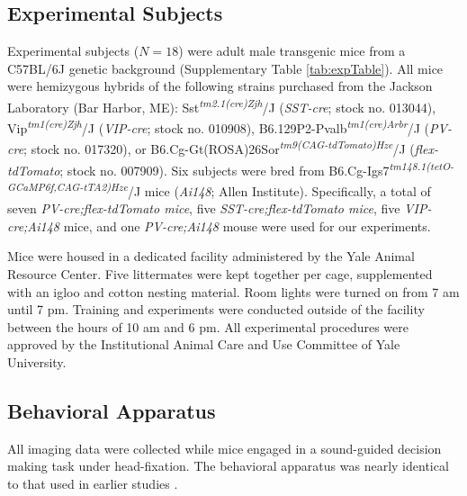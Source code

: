 

\label{sec:methods} %

\newcommand{\tg}[1]{\textsuperscript{\textit{#1}}}

\subsection*{Experimental Subjects}
Experimental subjects ($N=18$) were adult male transgenic mice from a C57BL/6J genetic background (Supplementary Table \ref{tab:expTable}). All mice were hemizygous hybrids of the following strains purchased from the Jackson Laboratory (Bar Harbor, ME): Sst\tg{tm2.1(cre)Zjh}/J (\emph{SST-cre}; stock no. 013044), Vip\tg{tm1(cre)Zjh}/J (\emph{VIP-cre}; stock no. 010908), B6.129P2-Pvalb\tg{tm1(cre)Arbr}/J (\emph{PV-cre}; stock no. 017320), or B6.Cg-Gt(ROSA)26Sor\tg{tm9(CAG-tdTomato)Hze}/J (\emph{flex-tdTomato}; stock no. 007909). Six subjects were bred from B6.Cg-Igs7\tg{tm148.1(tetO-GCaMP6f,CAG-tTA2)Hze}/J mice (\emph{Ai148}; Allen Institute). Specifically, a total of seven \emph{PV-cre;flex-tdTomato mice}, five \emph{SST-cre;flex-tdTomato mice}, five \emph{VIP-cre;Ai148} mice, and one \emph{PV-cre;Ai148} mouse were used for our experiments.



Mice were housed in a dedicated facility administered by the Yale Animal Resource Center. Five littermates were kept together per cage, supplemented with an igloo and cotton nesting material. Room lights were turned on from 7 am until 7 pm. Training and experiments were conducted outside of the facility between the hours of 10 am and 6 pm. All experimental procedures were approved by the Institutional Animal Care and Use Committee of Yale University.


\subsection*{Behavioral Apparatus}

All imaging data were collected while mice engaged in a sound-guided decision making task under head-fixation. The behavioral apparatus was nearly identical to that used in earlier studies \citep{siniscalchi2016fast,siniscalchi2019enhanced}. 


